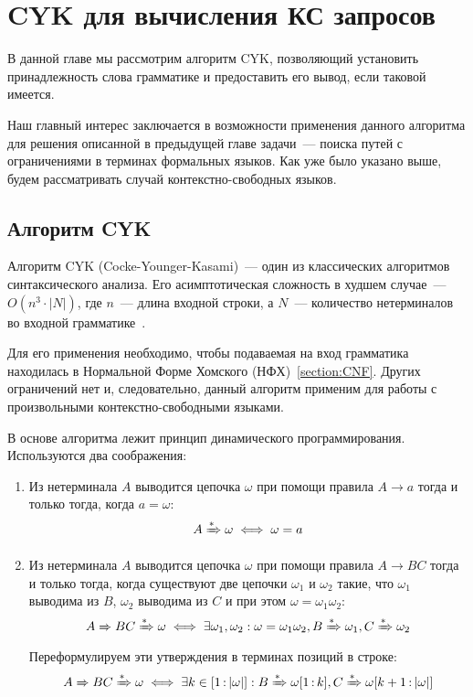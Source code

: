 \setchapterpreamble[u]{\margintoc}
\chapter{CYK для вычисления КС запросов}
\label{chpt:CFPQ_CYK}

В данной главе мы рассмотрим алгоритм CYK, позволяющий установить принадлежность слова грамматике и предоставить его вывод, если таковой имеется.

Наш главный интерес заключается в возможности применения данного алгоритма для решения описанной в предыдущей главе задачи~--- поиска путей с ограничениями в терминах формальных языков.
Как уже было указано выше, будем рассматривать случай контекстно-свободных языков.

\section{Алгоритм CYK}
\label{sect:lin_CYK}

Алгоритм CYK (Cocke-Younger-Kasami)~--- один из классических алгоритмов синтаксического анализа.
Его асимптотическая сложность в худшем случае~--- $O(n^3 \cdot |N|)$, где $n$~--- длина входной строки, а $N$~--- количество нетерминалов во входной грамматике~.

Для его применения необходимо, чтобы подаваемая на вход грамматика находилась в Нормальной Форме Хомского (НФХ)~\ref{section:CNF}.
Других ограничений нет и, следовательно, данный алгоритм применим для работы с произвольными контекстно-свободными языками.

В основе алгоритма лежит принцип динамического программирования.
Используются два соображения:
\begin{enumerate}
    \item Из нетерминала $A$ выводится цепочка $\omega$ при помощи правила $A \to a$ тогда и только тогда, когда $a = \omega$:
          \[ A \derives \omega \iff \omega = a \]
    \item Из нетерминала $A$ выводится цепочка $\omega$ при помощи правила $A \to B C$ тогда и только тогда, когда существуют две цепочки $\omega_1$ и $\omega_2$ такие, что $\omega_1$ выводима из $B$, $\omega_2$ выводима из $C$ и при этом $\omega = \omega_1 \omega_2$:
          \[ A \derives[] B C \derives \omega \iff \exists \omega_1, \omega_2 : \omega = \omega_1 \omega_2, B \derives \omega_1, C \derives \omega_2 \]
          Переформулируем эти утверждения в терминах позиций в строке:
          \[ A \derives[] B C \derives \omega \iff \exists k \in [1 \rng |\omega|] : B \derives \omega[1 \rng k], C \derives \omega[k+1 \rng |\omega|] \]
\end{enumerate}

